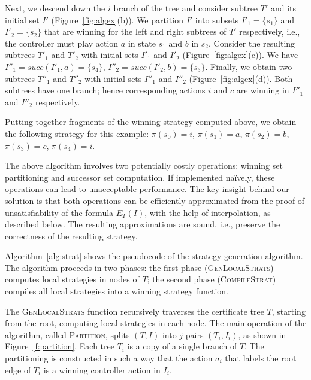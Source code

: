 \begin{example}

Next, we descend down the $i$ branch of the tree and consider subtree $T'$ and its initial set $I'$ (Figure~\ref{fig:algex}(b)).  We partition $I'$ into subsets $I'_1=\{s_1\}$ and $I'_2=\{s_2\}$ that are winning for the left and right subtrees of $T'$ respectively, i.e., the controller must play action $a$ in state $s_1$ and $b$ in $s_2$.  Consider the resulting subtrees $T'_1$ and $T'_2$ with initial sets $I'_1$ and $I'_2$ (Figure~\ref{fig:algex}(c)).  We have $I''_1 = succ(I'_1, a) = \{s_4\}$, $I''_2 = succ(I'_2, b) = \{s_3\}$.  Finally, we obtain two subtrees $T''_1$ and $T''_2$ with initial sets $I''_1$ and $I''_2$ (Figure~\ref{fig:algex}(d)).  Both subtrees have one branch; hence corresponding actions $i$ and $c$ are winning in $I''_1$ and $I''_2$ respectively.

Putting together fragments of the winning strategy computed above, 
we obtain the following strategy for this example: $\pi(s_0)=i$, 
$\pi(s_1)=a$, $\pi(s_2)=b$, $\pi(s_3)=c$, $\pi(s_4)=i$.
\end{example}

The above algorithm involves two potentially costly 
operations: winning set partitioning and successor set 
computation.  If implemented na\"ively, these operations can lead 
to unacceptable performance.  The key insight behind our solution 
is that both operations can be efficiently approximated from the 
proof of unsatisfiability of the formula $E_T(I)$, with the help 
of interpolation, as described below.  The resulting 
approximations are sound, i.e., preserve the correctness of the 
resulting strategy.

Algorithm~\ref{alg:strat} shows the pseudocode of the 
strategy generation algorithm.  The algorithm proceeds in two 
phases: the first phase (\textsc{GenLocalStrats}) computes local 
strategies in nodes of $T$; the second phase 
(\textsc{CompileStrat}) compiles all local strategies into a 
winning strategy function.

The \textsc{GenLocalStrats} function recursively traverses the
certificate tree $T$, starting from the root, computing local
strategies in each node.
The main operation of the algorithm, called \textsc{Partition},
splits $(T,I)$ into $j$ pairs $(T_i, I_i)$, as shown in
Figure~\ref{f:partition}.  Each tree $T_i$ is a copy of a single
branch of $T$.  The partitioning is constructed in such a way that
the action $a_i$ that labels the root edge of $T_i$ is a winning
controller action in $I_i$.

